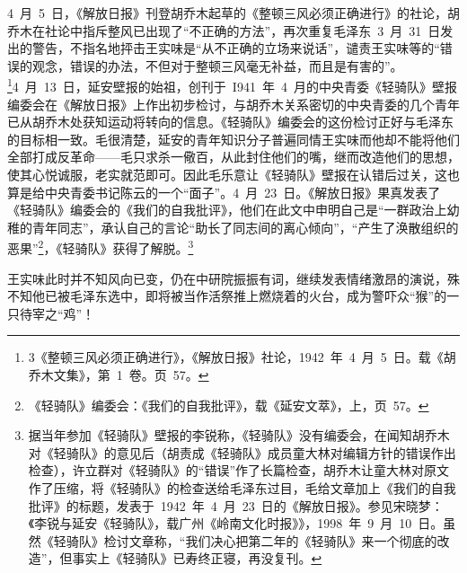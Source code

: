 4~月~5~日，《解放日报》刊登胡乔木起草的《整顿三风必须正确进行》的社论，胡乔木在社论中指斥整风已出现了“不正确的方法”，再次重复毛泽东~3~月~31~日发出的警告，不指名地抨击王实味是“从不正确的立场来说话”，谴责王实味等的“错误的观念，错误的办法，不但对于整顿三风毫无补益，而且是有害的”。\footnote{3《整顿三风必须正确进行》，《解放日报》社论，1942~年~4~月~5~日。载《胡乔木文集》，第~1~卷。页~57。}4~月~13~日，延安壁报的始祖，创刊于~I941~年~4~月的中央青委《轻骑队》壁报编委会在《解放日报》上作出初步检讨，与胡乔木关系密切的中央青委的几个青年已从胡乔木处获知运动将转向的信息。《轻骑队》编委会的这份检讨正好与毛泽东的目标相一致。毛很清楚，延安的青年知识分子普遍同情王实味而他却不能将他们全部打成反革命——毛只求杀一儆百，从此封住他们的嘴，继而改造他们的思想，使其心悦诚服，老实就范即可。因此毛乐意让《轻骑队》壁报在认错后过关，这也算是给中央青委书记陈云的一个“面子”。4~月~23~日。《解放日报》果真发表了《轻骑队》编委会的《我们的自我批评》，他们在此文中申明自己是“一群政治上幼稚的青年同志”，承认自己的言论“助长了同志间的离心倾向”，“产生了涣散组织的恶果”\footnote{《轻骑队》编委会：《我们的自我批评》，载《延安文萃》，上，页~57。}，《轻骑队》获得了解脱。\footnote{据当年参加《轻骑队》壁报的李锐称，《轻骑队》没有编委会，在闻知胡乔木对《轻骑队》的意见后（胡责成《轻骑队》成员童大林对编辑方针的错误作出检查），许立群对《轻骑队》的“错误”作了长篇检查，胡乔木让童大林对原文作了压缩，将《轻骑队》的检查送给毛泽东过目，毛给文章加上《我们的自我批评》的标题，发表于~1942~年~4~月~23~日的《解放日报》。参见宋晓梦：《李锐与延安《轻骑队》，载广州《岭南文化时报》》，1998~年~9~月~10~日。虽然《轻骑队》检讨文章称，“我们决心把第二年的《轻骑队》来一个彻底的改造”，但事实上《轻骑队》已寿终正寝，再没复刊。}

王实味此时并不知风向已变，仍在中研院振振有词，继续发表情绪激昂的演说，殊不知他已被毛泽东选中，即将被当作活祭推上燃烧着的火台，成为警吓众“猴”的一只待宰之“鸡”！

